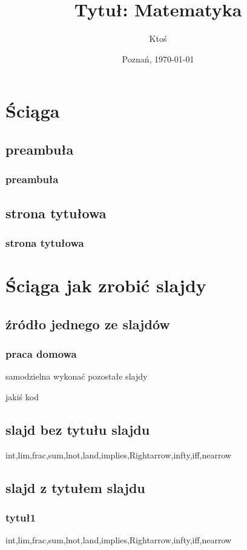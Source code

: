 \documentclass{beamer}
\title{Tytuł: Matematyka}
\author{Ktoś}
\institute{PP II}
\date{Poznań, \today}
\begin{document}
\maketitle


\section{Ściąga}

\subsection{preambuła}
\begin{frame}
	\frametitle{preambuła}
\end{frame}

\subsection{strona tytułowa}
\begin{frame}
	\frametitle{strona tytułowa}
\end{frame}


\section{Ściąga jak zrobić slajdy}

\subsection{źródło jednego ze slajdów}
\begin{frame}
	\frametitle{praca domowa}
	\begin{block}{samodzielna}
		wykonać pozostałe slajdy
	\end{block}
	\begin{block}{}
		jakiś kod
	\end{block}
\end{frame}

\subsection{slajd bez tytułu slajdu}
\begin{frame}
	int,lim,frac,sum,lnot,land,implies,Rightarrow,infty,iff,nearrow
\end{frame}

\subsection{slajd z tytułem slajdu}
\begin{frame}
	\frametitle{tytuł1}
	int,lim,frac,sum,lnot,land,implies,Rightarrow,infty,iff,nearrow
\end{frame}
\end{document}
